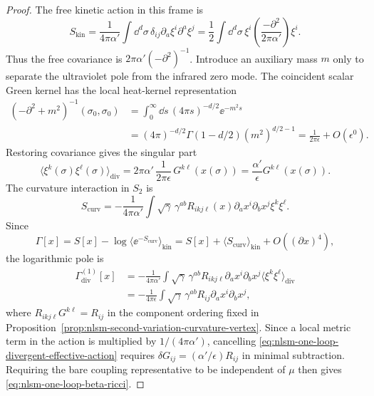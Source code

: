 \begin{proof}
The free kinetic action in this frame is
\[
  S_{\mathrm{kin}}
  =
  \frac1{4\pi\alpha'}
  \int\dd^d\sigma\,\delta_{ij}\partial_a\xi^i\partial^a\xi^j
  =
  \frac12
  \int\dd^d\sigma\,\xi^i
  \left(\frac{-\partial^2}{2\pi\alpha'}\right)\xi^i .
\]
Thus the free covariance is \(2\pi\alpha'(-\partial^2)^{-1}\).  Introduce an
auxiliary mass \(m\) only to separate the ultraviolet pole from the infrared
zero mode.  The coincident scalar Green kernel has the local heat-kernel
representation
\begin{equation}
\begin{aligned}
  (-\partial^2+m^2)^{-1}(\sigma_0,\sigma_0)
  &=
  \int_0^\infty\dd s\,
  (4\pi s)^{-d/2}\ee^{-m^2s}
  \\
  &=
  (4\pi)^{-d/2}\Gamma(1-d/2)(m^2)^{d/2-1}
  =
  \frac1{2\pi\epsilon}+O(\epsilon^0).
\end{aligned}
  \label{eq:nlsm-local-heat-kernel-pole}
\end{equation}
Restoring covariance gives the singular part
\begin{equation}
  \langle \xi^k(\sigma)\xi^\ell(\sigma)\rangle_{\mathrm{div}}
  =
  2\pi\alpha'\,
  \frac1{2\pi\epsilon}\,
  G^{k\ell}(x(\sigma))
  =
  \frac{\alpha'}{\epsilon}G^{k\ell}(x(\sigma)).
  \label{eq:nlsm-free-fluctuation-coincident-pole}
\end{equation}
The curvature interaction in \(S_2\) is
\[
  S_{\mathrm{curv}}
  =
  -\frac1{4\pi\alpha'}
  \int\sqrt\gamma\,\gamma^{ab}
  R_{ikj\ell}(x)\partial_ax^i\partial_bx^j\xi^k\xi^\ell .
\]
Since
\[
  \Gamma[x]
  =
  S[x]-\log\langle \ee^{-S_{\mathrm{curv}}}\rangle_{\mathrm{kin}}
  =
  S[x]+\langle S_{\mathrm{curv}}\rangle_{\mathrm{kin}}
  +O((\partial x)^4),
\]
the logarithmic pole is
\[
\begin{aligned}
  \Gamma^{(1)}_{\mathrm{div}}[x]
  &=
  -\frac1{4\pi\alpha'}
  \int\sqrt\gamma\,\gamma^{ab}
  R_{ikj\ell}\partial_ax^i\partial_bx^j
  \langle\xi^k\xi^\ell\rangle_{\mathrm{div}}
  \\
  &=
  -\frac1{4\pi\epsilon}
  \int\sqrt\gamma\,\gamma^{ab}
  R_{ij}\partial_ax^i\partial_bx^j ,
\end{aligned}
\]
where \(R_{ikj\ell}G^{k\ell}=R_{ij}\) in the component ordering fixed in
Proposition~\ref{prop:nlsm-second-variation-curvature-vertex}.  Since a
local metric term in the action is multiplied by \(1/(4\pi\alpha')\),
cancelling \eqref{eq:nlsm-one-loop-divergent-effective-action} requires
\(\delta G_{ij}=(\alpha'/\epsilon)R_{ij}\) in minimal subtraction.  Requiring
the bare coupling representative to be independent of \(\mu\) then gives
\eqref{eq:nlsm-one-loop-beta-ricci}.
\end{proof}

